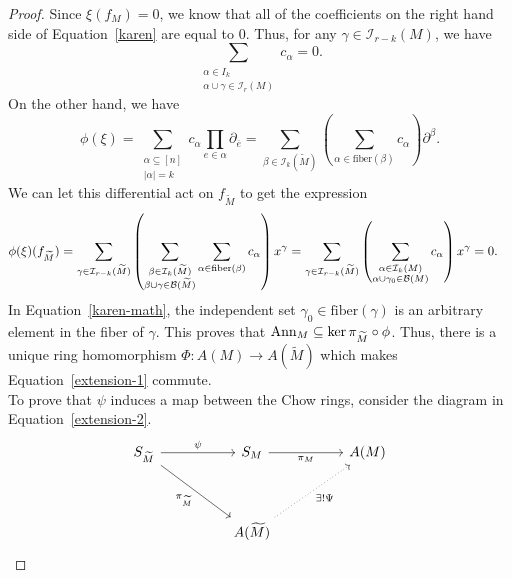 \documentclass{puthesis-UG}
\begin{document}
\begin{proof}
Since $\xi(f_M) = 0$, we know that all of the coefficients on the right hand side of Equation~\ref{karen} are equal to $0$. Thus, for any $\gamma \in \mathcal{I}_{r-k}(M)$, we have 
\[
	\sum_{\substack{\alpha \in I_k \\ \alpha \cup \gamma \in \mathcal{I}_r(M)}} c_\alpha = 0.
\]
On the other hand, we have 
\[
	\phi (\xi) = \sum_{\substack{\alpha \subseteq [n] \\ |\alpha| = k}} c_\alpha \prod_{e \in \alpha} \partial_{\overline{e}} = \sum_{\beta \in \mathcal{I}_{k}(\widetilde{M})} \left ( \sum_{\alpha \in \text{fiber}(\beta)} c_\alpha \right ) \partial^\beta. 
\]
We can let this differential act on $f_{\widetilde{M}}$ to get the expression
\begin{align} \label{karen-math}
	\phi(\xi) (f_{\widetilde{M}}) & = \sum_{\gamma \in \mathcal{I}_{r-k}(\widetilde{M})} \left ( \sum_{\substack{\beta \in \mathcal{I}_k(\widetilde{M}) \\ \beta \cup \gamma \in \mathcal{B}(\widetilde{M})}} \sum_{\alpha \in \text{fiber}(\beta)} c_\alpha \right ) x^\gamma = \sum_{\gamma \in \mathcal{I}_{r-k}(\widetilde{M})} \left ( \sum_{\substack{\alpha \in \mathcal{I}_k(M) \\ \alpha \cup \gamma_0 \in \mathcal{B}(M)}} c_\alpha \right ) x^\gamma = 0.
\end{align}
In Equation~\ref{karen-math}, the independent set $\gamma_0 \in \text{fiber}(\gamma)$ is an arbitrary element in the fiber of $\gamma$. This proves that $\operatorname{Ann}_M \subseteq \ker \pi_{\widetilde{M}} \circ \phi$. Thus, there is a unique ring homomorphism $\Phi : A(M) \to A(\widetilde{M})$ which makes Equation~\ref{extension-1} commute. \\

To prove that $\psi$ induces a map between the Chow rings, consider the diagram in Equation~\ref{extension-2}. 
\begin{equation} \label{extension-2}
\begin{tikzcd}
	{S_{\widetilde{M}}} && {S_M} && {A(M)} \\
	\\
	&& {A(\widetilde{M})}
	\arrow["{\pi_{\widetilde{M}}}"', from=1-1, to=3-3]
	\arrow["\psi", from=1-1, to=1-3]
	\arrow["{\pi_M}"', from=1-3, to=1-5]
	\arrow["{\exists! \Psi}"', dotted, from=3-3, to=1-5]
\end{tikzcd}
\end{equation}


\end{proof}
\end{document}
